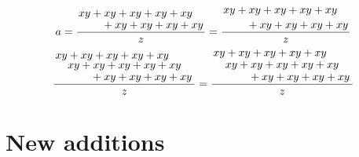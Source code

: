 \documentclass{article}
\begin{document}
\[
a=\frac{
    \splitfrac{xy + xy + xy + xy + xy}
              {+ xy + xy + xy + xy}
  }
  {z}
=\frac{
    \splitdfrac{xy + xy + xy + xy + xy}
              {+ xy + xy + xy + xy}
  }
  {z}
\]
\[
\frac{
    \splitfrac{xy + xy + xy + xy + xy}
    {
    \splitfrac{xy + xy + xy + xy + xy}
              {+ xy + xy + xy + xy}
    }
  }
  {z}
=\frac{
    \splitfrac{xy + xy + xy + xy + xy}
    {
    \splitfrac{\mathstrut  xy + xy + xy + xy + xy}
              {+ xy + xy + xy + xy}
    }
  }
  {z}
\]

\section{New additions}


\end{document}
